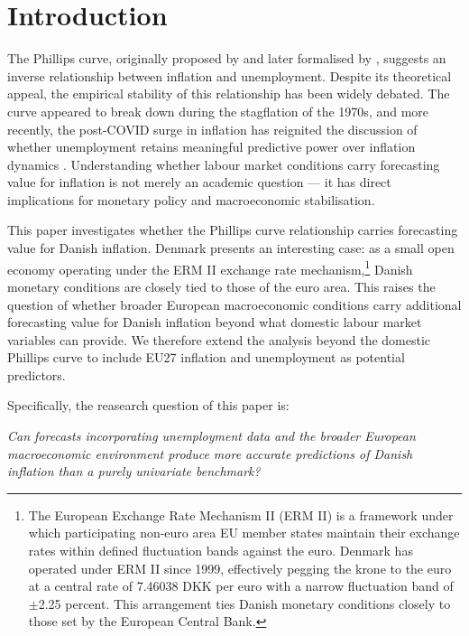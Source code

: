 \chapter{Introduction}\label{sec:introduction}

The Phillips curve, originally proposed by \textcite{phillips1958} and later 
formalised by \textcite{samuelson1960}, suggests an inverse relationship 
between inflation and unemployment. Despite its theoretical appeal, the 
empirical stability of this relationship has been widely debated. The curve 
appeared to break down during the stagflation of the 1970s, and more recently, 
the post-COVID surge in inflation has reignited the discussion of whether 
unemployment retains meaningful predictive power over inflation dynamics 
\parencite{stock2019}. Understanding whether labour market conditions carry 
forecasting value for inflation is not merely an academic question — it has 
direct implications for monetary policy and macroeconomic stabilisation.

This paper investigates whether the Phillips curve relationship carries forecasting 
value for Danish inflation. Denmark presents an interesting case: as a small open 
economy operating under the ERM II exchange rate mechanism,\footnote{The European 
Exchange Rate Mechanism II (ERM II) is a framework under which participating 
non-euro area EU member states maintain their exchange rates within defined 
fluctuation bands against the euro. Denmark has operated under ERM II since 1999, 
effectively pegging the krone to the euro at a central rate of 7.46038 DKK per 
euro with a narrow fluctuation band of $\pm$2.25 percent. This arrangement ties 
Danish monetary conditions closely to those set by the European Central Bank.} 
Danish monetary conditions are closely tied to those of the euro area. This raises 
the question of whether broader European macroeconomic conditions carry additional 
forecasting value for Danish inflation beyond what domestic labour market variables 
can provide. We therefore extend the analysis beyond the domestic Phillips curve to 
include EU27 inflation and unemployment as potential predictors.


Specifically, the reasearch question of this paper is:

\textit{Can forecasts incorporating unemployment data and the broader European 
macroeconomic environment produce more accurate predictions of Danish inflation 
than a purely univariate benchmark?}


